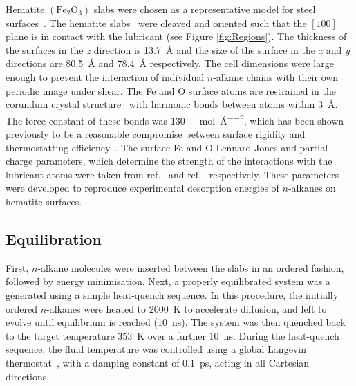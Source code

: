 \documentclass[5p]{elsarticle}
\begin{document}
Hematite $\left(\text{Fe}_2\text{O}_3\right)$ slabs were chosen as a representative model for steel surfaces~\cite{Oh1998}. The hematite  slabs~\cite{Maslen1994} were cleaved and oriented such that the $\left[100\right]$ plane is in contact with the lubricant (see Figure \ref{fig:Regions}). The thickness of the surfaces in the \emph{z} direction is \SI{13.7}{\angstrom} and the size of the surface in the \emph{x} and \emph{y} directions are \SI{80.5}{\angstrom} and \SI{78.4}{\angstrom} respectively. The cell dimensions were large enough to prevent the interaction of individual $n$-alkane chains with their own periodic image under shear. The Fe and O surface atoms are restrained in the corundum crystal structure~\cite{Maslen1994} with harmonic bonds between atoms within \SI{3}{\angstrom}. The force constant of these bonds was  \SI{130}{\kilo\calorie\per\mol\per\angstrom\squared}, which has been shown previously to be a reasonable compromise between surface rigidity and thermostatting efficiency~\cite{Berro2010}. The surface Fe and O Lennard-Jones and partial charge parameters, which determine the strength of the interactions with the lubricant atoms were taken from  ref.~\cite{Savio2012} and ref.~\cite{Berro2010} respectively. These parameters were developed to reproduce experimental desorption energies of $n$-alkanes on hematite surfaces.~\cite{Savio2012}

\subsection{Equilibration}

First, $n$-alkane molecules were inserted between the slabs in an ordered fashion, followed by energy minimisation. Next, a properly equilibrated system was a generated using a simple heat-quench sequence. In this procedure, the initially ordered $n$-alkanes were heated to \SI{2000}{\kelvin} to accelerate diffusion, and left to evolve until equilibrium is reached (\SI{10}{\nano\second}). The system was then quenched back to the target temperature \SI{353}{\kelvin} over a further \SI{10}{\nano\second}. During the heat-quench sequence, the fluid temperature was controlled using a global Langevin thermostat~\cite{Schneider1978}, with a damping constant of \SI{0.1}{\pico\second}, acting in all Cartesian directions.
\end{document}
